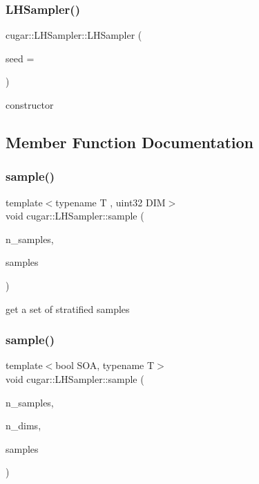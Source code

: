 \subsubsection{\texorpdfstring{L\+H\+Sampler()}{LHSampler()}}
{\footnotesize\ttfamily cugar\+::\+L\+H\+Sampler\+::\+L\+H\+Sampler (\begin{DoxyParamCaption}\item[{const uint32}]{seed = {} }\end{DoxyParamCaption})\hspace{0.3cm}{\ttfamily [inline]}}

constructor 

\subsection{Member Function Documentation}
\mbox{\label{structcugar_1_1_l_h_sampler_a834984a5429b711dc3be799b927905d1}} 
\subsubsection{\texorpdfstring{sample()}{sample()}\hspace{0.1cm}{\footnotesize\ttfamily [1/2]}}
{\footnotesize\ttfamily template$<$typename T , uint32 D\+IM$>$ \\
void cugar\+::\+L\+H\+Sampler\+::sample (\begin{DoxyParamCaption}\item[{const uint32}]{n\+\_\+samples,  }\item[{\hyperlink{structcugar_1_1_vector}{Vector}$<$ T, D\+IM $>$ $\ast$}]{samples }\end{DoxyParamCaption})}

get a set of stratified samples \mbox{\label{structcugar_1_1_l_h_sampler_ab3422ecf79d29b9327cda1633f01caae}} 
\subsubsection{\texorpdfstring{sample()}{sample()}\hspace{0.1cm}{\footnotesize\ttfamily [2/2]}}
{\footnotesize\ttfamily template$<$bool S\+OA, typename T$>$ \\
void cugar\+::\+L\+H\+Sampler\+::sample (\begin{DoxyParamCaption}\item[{const uint32}]{n\+\_\+samples,  }\item[{const uint32}]{n\+\_\+dims,  }\item[{T $\ast$}]{samples }\end{DoxyParamCaption})}

